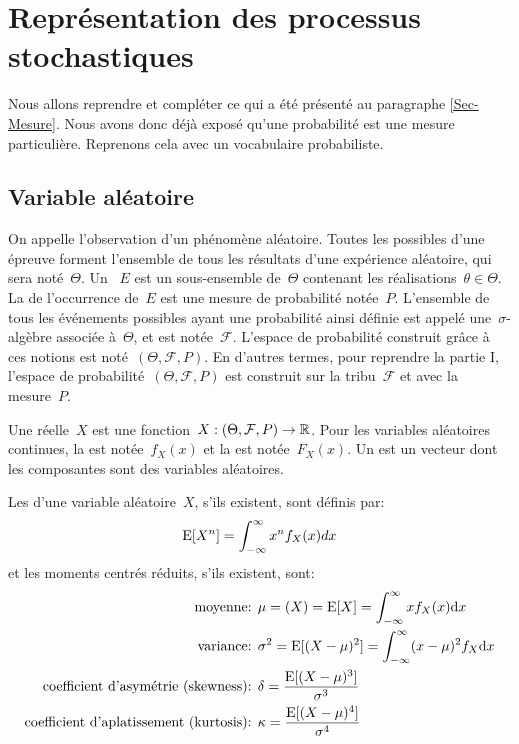 \medskip
\section{Représentation des processus stochastiques}

Nous allons reprendre et compléter ce qui a été présenté au paragraphe \ref{Sec-Mesure}.
Nous avons donc déjà exposé qu'une probabilité est une mesure particulière.
Reprenons cela avec un vocabulaire probabiliste.

\medskip
\subsection{Variable aléatoire}

On appelle  l'observation d'un phénomène aléatoire.
Toutes les  possibles d'une épreuve forment l'ensemble de tous les résultats d'une expérience aléatoire, qui sera noté~$\Theta$.
Un ~$E$ est un sous-ensemble de~$\Theta$ contenant les réalisations~$\theta\in\Theta$.
La  de l'occurrence de~$E$ est une mesure de probabilité notée~$P$.
L'ensemble de tous les événements possibles ayant une probabilité ainsi définie est appelé une~$\sigma$-algèbre associée à~$\Theta$, et est notée~$\mathcal{F}$.
L'espace de probabilité construit grâce à ces notions est noté~$(\Theta,\mathcal{F},P)$.
En d'autres termes, pour reprendre la partie I, l'espace de probabilité~$(\Theta,\mathcal{F},P)$ est construit sur la tribu~$\mathcal{F}$ et avec la mesure~$P$.

\medskip
Une  réelle~$X$ est une fonction~$X : (\Theta,\mathcal{F},P) \rightarrow \mathbb R$.
Pour les variables aléatoires continues, la  est notée~$f_X(x)$ et la  est notée~$F_X(x)$.
Un  est un vecteur dont les composantes sont des variables aléatoires.

\medskip
\begin{definition}
Les  d'une variable aléatoire~$X$, s'ils existent, sont définis par:
\begin{equation}
\operatorname{E}[X^n] = \displaystyle\int_{-\infty}^\infty x^nf_X(x)dx
\end{equation}
et les moments centrés réduits, s'ils existent, sont:
\begin{align}
\text{moyenne: } & \mu = \left(X\right) = \operatorname{E}[X] = \displaystyle\int_{-\infty}^\infty xf_X(x) \text{d} x  \\
\text{variance: } & \sigma^2 = \operatorname{E}[(X-\mu)^2] = \displaystyle\int_{-\infty}^\infty (x-\mu)^2f_X \text{d} x \\
\text{coefficient d'asymétrie (skewness): } & \delta = \dfrac{\operatorname{E}[(X-\mu)^3]}{\sigma^3} \\
\text{coefficient d'aplatissement (kurtosis): } & \kappa = \dfrac{\operatorname{E}[(X-\mu)^4]}{\sigma^4}
\end{align}
\end{definition}


